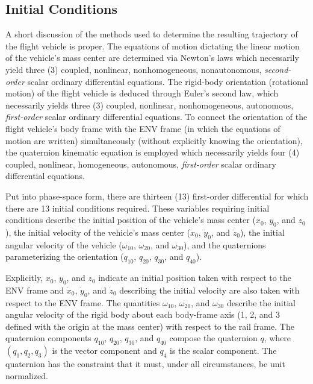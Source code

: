 \documentclass[11pt,dvipsnames]{thesis}
\begin{document}
\subsection{Initial Conditions}
A short discussion of the methods used to determine the resulting trajectory of the flight vehicle is proper. The equations of motion dictating the linear motion of the vehicle's mass center are determined via Newton's laws which necessarily yield three (3) coupled, nonlinear, nonhomogeneous, nonautonomous, \textit{second-order} scalar ordinary differential equations. The rigid-body orientation (rotational motion) of the flight vehicle is deduced through Euler's second law, which necessarily yields three (3) coupled, nonlinear, nonhomogeneous, autonomous, \textit{first-order} scalar ordinary differential equations. To connect the orientation of the flight vehicle's body frame with the ENV frame (in which the equations of motion are written) simultaneously (without explicitly knowing the orientation), the quaternion kinematic equation is employed which necessarily yields four (4) coupled, nonlinear, homogeneous, autonomous, \textit{first-order} scalar ordinary differential equations.

Put into phase-space form, there are thirteen (13) first-order differential for which there are 13 initial conditions required. These variables requiring initial conditions describe the initial position of the vehicle's mass center ($x_0$, $y_0$, and $z_0$), the initial velocity of the vehicle's mass center ($\dot{x}_0$, $\dot{y}_0$, and $\dot{z}_0$), the initial angular velocity of the vehicle ($\omega_{10}$, $\omega_{20}$, and $\omega_{30}$), and the quaternions parameterizing the orientation ($q_{10}$, $q_{20}$, $q_{30}$, and $q_{40}$).

Explicitly, $x_0$, $y_0$, and $z_0$ indicate an initial position taken with respect to the ENV frame and $\dot{x}_0$, $\dot{y}_0$, and $\dot{z}_0$ describing the initial velocity are also taken with respect to the ENV frame. The quantities $\omega_{10}$, $\omega_{20}$, and $\omega_{30}$ describe the initial angular velocity of the rigid body about each body-frame axis (1, 2, and 3 defined with the origin at the mass center) with respect to the rail frame. The quaternion components $q_{10}$, $q_{20}$, $q_{30}$, and $q_{40}$ compose the quaternion $q$, where $(q_1, q_2, q_3)$ is the vector component and $q_4$ is the scalar component. The quaternion has the constraint that it must, under all circumstances, be unit normalized.
\end{document}
